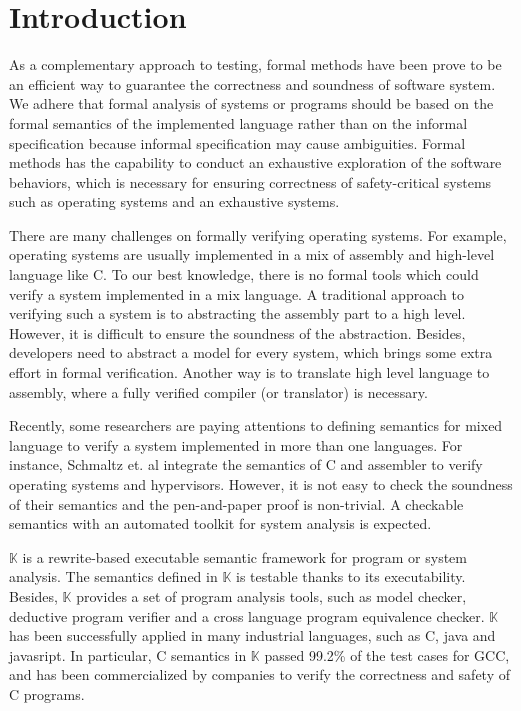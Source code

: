 \documentclass[conference]{IEEEtran}
\begin{document}
\section{Introduction}
\par As a complementary approach to testing, formal methods have been prove to be an efficient way to  guarantee the correctness and soundness of software system.
We adhere that formal analysis of systems or programs should be based on the formal semantics of the implemented language rather than on the informal specification because informal specification may cause ambiguities.
 Formal methods has the capability to conduct an exhaustive exploration of the software behaviors, which is necessary for ensuring correctness of safety-critical systems such as operating systems and an exhaustive systems.

 There are many challenges on formally verifying operating systems. For example, operating systems are usually implemented in a mix of assembly and high-level language like C. To our best knowledge, there is no formal tools which could verify a system implemented in a mix language. A traditional approach to verifying such a system is to abstracting the assembly part to a high level. However, it is difficult to ensure the soundness of the abstraction. Besides, developers need to abstract a model for every system, which brings some extra effort in formal verification. Another way is to translate high level language to assembly, where a fully verified compiler (or translator) is necessary.

 Recently, some researchers are paying attentions to defining semantics for mixed language to verify a system implemented in more than one languages. For instance, Schmaltz et. al \cite{} integrate the semantics of C and assembler to verify operating systems and hypervisors. However, it is not easy to check the soundness of their semantics and the pen-and-paper proof is non-trivial. A checkable semantics with an automated toolkit for system analysis is expected.

 $\mathbb{K}$ is a rewrite-based executable semantic framework for program or system analysis. The semantics defined in $\mathbb{K}$ is testable thanks to its executability. Besides, $\mathbb{K}$ provides a set of program analysis tools, such as model checker, deductive
 program verifier and a cross language program
 equivalence checker. $\mathbb{K}$ has been successfully applied in many industrial languages, such as C, java and javasript. In particular, C semantics in $\mathbb{K}$ passed 99.2\% of the test cases for GCC, and has been commercialized by companies to verify the correctness and safety of C programs.
\end{document}
